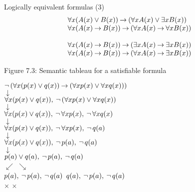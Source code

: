 \documentclass[style=simple,size=12pt]{powerdot}
\begin{document}
\begin{wideslide}[bm=,toc=]{Logically equivalent formulas (3)}
\begin{displaymath}
\begin{array}{l}
 \forall x(A(x)\vee B(x)) \mathbin{\rightarrow}
(\forall xA(x) \vee \exists xB(x)) \\
 \forall x(A(x)\mathbin{\rightarrow} B(x))\mathbin{\rightarrow}
  (\forall xA(x)\mathbin{\rightarrow}\forall xB(x)) \\
\\
\forall x(A(x)\mathbin{\rightarrow} B(x))\mathbin{\rightarrow}
  (\exists xA(x)\mathbin{\rightarrow}\exists xB(x)) \\
 \forall x(A(x)\mathbin{\rightarrow} B(x))\mathbin{\rightarrow}
  (\forall xA(x)\mathbin{\rightarrow}\exists xB(x))
\end{array}
\end{displaymath}
\end{wideslide}

\begin{wideslide}[bm=,toc=]{Figure 7.3: Semantic tableau for a satisfiable formula}
\begin{center}
$\mathop{\neg}\,(\forall x(p(x)\vee q(x)) \mathbin{\rightarrow}
(\forall xp(x) \vee \forall xq(x)))$ \\
$\downarrow$ \\
$\forall x(p(x)\vee q(x)),\: \mathop{\neg}\,(\forall xp(x) \vee \forall xq(x))$ \\
$\downarrow$ \\
$\forall x(p(x)\vee q(x)),\: \mathop{\neg} \forall xp(x),\:
  \mathop{\neg} \forall xq(x)$ \\
$\downarrow$ \\
$\forall x(p(x)\vee q(x)),\: \mathop{\neg} \forall xp(x),\: \mathop{\neg} q(a)$ \\
$\downarrow$ \\
$\forall x(p(x)\vee q(x)),\: \mathop{\neg} p(a),\: \mathop{\neg} q(a)$ \\
$\downarrow$ \\
$p(a)\vee q(a),\: \mathop{\neg} p(a),\: \mathop{\neg} q(a)$ \\
$\swarrow$ \hspace{5em} $\searrow$ \\
$p(a),\: \mathop{\neg} p(a),\: \mathop{\neg} q(a)$ \hspace{5em}
  $q(a),\: \mathop{\neg} p(a),\:  \mathop{\neg} q(a)$ \\
$\times$ \hspace{9em} $\times$
\end{center}
\end{wideslide}
\end{document}
